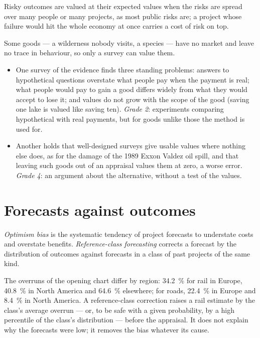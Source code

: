 Risky outcomes are valued at their expected values when the risks are spread
over many people or many projects, as most public risks are; a project whose
failure would hit the whole economy at once carries a cost of risk on top.

\begin{debate}
Some goods --- a wilderness nobody visits, a species --- have no market and leave no
trace in behaviour, so only a survey can value them.
\begin{itemize}
\item One survey of the evidence finds three standing problems: answers to
hypothetical questions overstate what people pay when the payment is real; what
people would pay to gain a good differs widely from what they would accept to lose
it; and values do not grow with the scope of the good (saving one lake is valued
like saving ten). %
\emph{Grade 2}: experiments comparing hypothetical with real payments, but for
goods unlike those the method is used for.
\item Another holds that well-designed surveys give usable values where nothing
else does, as for the damage of the 1989 Exxon Valdez oil spill, and that leaving
such goods out of an appraisal values them at zero, a worse error.
\emph{Grade 4}: an argument about the alternative, without a test of the values.
\end{itemize}
\end{debate}

\section{Forecasts against outcomes}\label{sec:b3:cost-benefit-analysis:forecasts}

\begin{definition}\label{def:b3:cost-benefit-analysis:optimism-bias}
\emph{Optimism bias} is the systematic tendency of project forecasts to understate
costs and overstate benefits. \emph{Reference-class forecasting} corrects a forecast
by the distribution of outcomes against forecasts in a class of past projects of
the same kind.
\end{definition}

The overruns of the opening chart differ by region: 34.2~\% for rail in Europe, 40.8~\%
in North America and 64.6~\% elsewhere; for roads, 22.4~\% in Europe and 8.4~\% in North
America. %
A reference-class correction raises a rail estimate by the class's average overrun
--- or, to be safe with a given probability, by a high percentile of the class's
distribution --- before the appraisal. It does not explain why the forecasts were
low; it removes the bias whatever its cause.

